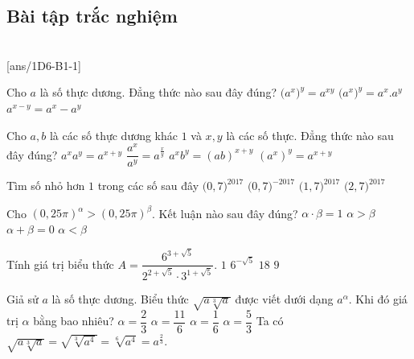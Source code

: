 \subsection{Bài tập trắc nghiệm}
 \\
\setcounter{ex}{0}
[ans/1D6-B1-1]
\begin{ex}%
	Cho $a$ là số thực dương. Đẳng thức nào sau đây đúng?
	{\True $\big( {a^x}\big)^y=a^{xy}$}
	{ $\big( {a^x}\big)^y=a^{x}.a^{y}$}
	{$a^{x-y}=a^{x}-a^{y}$}
\end{ex}

\begin{ex}%
	Cho $a,b$ là các số thực dương khác $1$ và $x,y$ là các số thực. Đẳng thức nào sau đây đúng?
	\choice
	{\True $a^xa^y=a^{x+y}$}
	{$\dfrac{a^x}{a^y}=a^{\frac{x}{y}}$}
	{$a^xb^y=(ab)^{x+y}$}
	{$(a^x)^y=a^{x+y}$}
	\loigiai{
	}
\end{ex}
\begin{ex}
	Tìm số nhỏ hơn $1$ trong các số sau đây
	\choice
	{\True $\big(0,7\big)^{2017}$}
	{$\big(0,7\big)^{-2017}$}
	{$\big(1,7\big)^{2017}$}
	{$\big(2,7\big)^{2017}$}
\end{ex}

\begin{ex}
	Cho $\left(0{,}25\pi\right)^{\alpha}>\left(0{,}25\pi\right)^{\beta}$. Kết luận nào sau đây đúng?
	\choice
	{$\alpha\cdot \beta=1$}
	{$\alpha>\beta$}
	{$\alpha+\beta=0$}
	{\True $\alpha<\beta$}
\end{ex}

\begin{ex}
	Tính giá trị biểu thức $A = \dfrac{6^{3+\sqrt{5}}}{2^{2+\sqrt{5}}\cdot 3^{1+\sqrt{5}}}$.
	\choice
	{$1$}
	{$6^{-\sqrt{5}}$}
	{\True $18$}
	{$9$}
\end{ex}

\begin{ex}
	Giả sử $a$ là số thực dương. Biểu thức $\sqrt{a\sqrt[3]{a}}$ được viết dưới dạng $a^\alpha$. Khi đó giá trị $\alpha$ bằng bao nhiêu?
	\choice
	{\True $\alpha=\dfrac{2}{3}$}
	{$\alpha=\dfrac{11}{6}$}
	{$\alpha=\dfrac{1}{6}$}
	{$\alpha=\dfrac{5}{3}$}
	\loigiai
	{
		Ta có $\sqrt{a\sqrt[3]{a}}=\sqrt{\sqrt[3]{a^4}}=\sqrt[6]{a^4}=a^{\frac{2}{3}}$.
	}
\end{ex}

